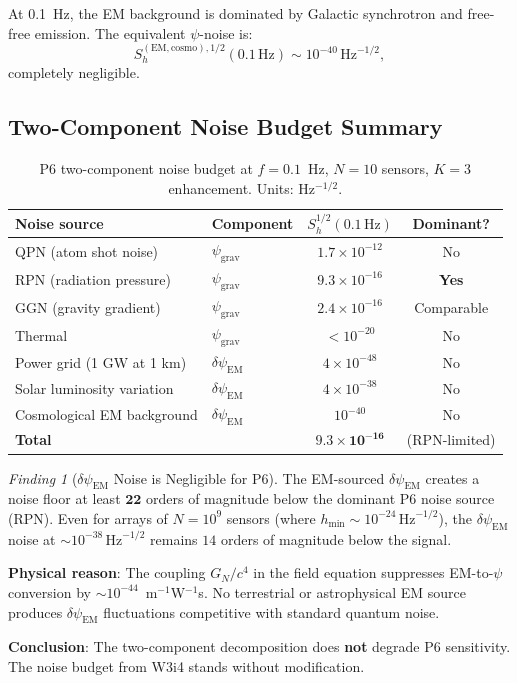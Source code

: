 \documentclass[11pt]{article}
\theoremstyle{definition}
\theoremstyle{remark}
\newtheorem{finding}[theorem]{Finding}
\newcommand{\ee}[1]{\times10^{#1}}
\newcommand{\sqrtHz}{\,\mathrm{Hz}^{-1/2}}
\newcommand{\psigrav}{\psi_{\mathrm{grav}}}
\newcommand{\dpsiem}{\delta\psi_{\mathrm{EM}}}
\newcommand{\GN}{G_N}
\begin{document}
At 0.1~Hz, the EM background is dominated by Galactic synchrotron
and free-free emission. The equivalent $\psi$-noise is:
\begin{equation}
S_h^{(\mathrm{EM,cosmo}),1/2}(0.1\,\mathrm{Hz})
\sim 10^{-40}\sqrtHz,
\end{equation}
completely negligible.

\subsection{Two-Component Noise Budget Summary}

\begin{table}[h]
\centering
\caption{P6 two-component noise budget at $f = 0.1$~Hz, $N=10$ sensors,
$K=3$ enhancement. Units: Hz$^{-1/2}$.}
\label{tab:P6-noise-budget}
\begin{tabular}{@{}llcc@{}}
\toprule
Noise source & Component & $S_h^{1/2}(0.1\,\mathrm{Hz})$ & Dominant? \\
\midrule
QPN (atom shot noise)   & $\psigrav$ & $1.7\ee{-12}$ & No \\
RPN (radiation pressure) & $\psigrav$ & $9.3\ee{-16}$ & \textbf{Yes} \\
GGN (gravity gradient)   & $\psigrav$ & $2.4\ee{-16}$ & Comparable \\
Thermal                  & $\psigrav$ & $< 10^{-20}$ & No \\
\midrule
Power grid (1 GW at 1 km) & $\dpsiem$ & $4\ee{-48}$ & No \\
Solar luminosity variation & $\dpsiem$ & $4\ee{-38}$ & No \\
Cosmological EM background & $\dpsiem$ & $10^{-40}$ & No \\
\midrule
\textbf{Total} & & $\mathbf{9.3\ee{-16}}$ & (RPN-limited) \\
\bottomrule
\end{tabular}
\end{table}

\begin{finding}[$\dpsiem$ Noise is Negligible for P6]
\label{finding:P6-EM-noise}
The EM-sourced $\dpsiem$ creates a noise floor at least $\mathbf{22}$
orders of magnitude below the dominant P6 noise source (RPN). Even for
arrays of $N = 10^9$ sensors (where $h_{\min} \sim 10^{-24}\sqrtHz$),
the $\dpsiem$ noise at $\sim 10^{-38}\sqrtHz$ remains $14$ orders of
magnitude below the signal.

\textbf{Physical reason}: The coupling $\GN/c^4$ in the field equation
suppresses EM-to-$\psi$ conversion by $\sim 10^{-44}$~m$^{-1}$W$^{-1}$s.
No terrestrial or astrophysical EM source produces $\dpsiem$ fluctuations
competitive with standard quantum noise.

\textbf{Conclusion}: The two-component decomposition does \textbf{not}
degrade P6 sensitivity. The noise budget from W3i4 stands without
modification.
\end{finding}
\end{document}
